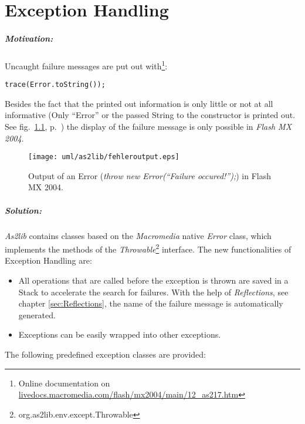 \chapter{Exception Handling}
\label{sec:ExceptionHandling}

\paragraph{Motivation:}
Uncaught failure messages are put out with\footnote{Online documentation on \href{http://livedocs.macromedia.com/flash/mx2004/main/12_as217.htm}{livedocs.macromedia.com/flash/mx2004/main/12\_as217.htm}}:
\begin{lstlisting}[frame=single]
trace(Error.toString());
\end{lstlisting}
Besides the fact that the printed out information is only little or not at all informative (Only ``Error'' or the passed String to the constructor is printed out. See fig.\ \ref{fig:fehleroutput}, p.\ \pageref{fig:fehleroutput}) the display of the failure message is only possible in {\sl Flash MX 2004}.

\begin{figure}[!ht]
\begin{center}
\texttt{[image: uml/as2lib/fehleroutput.eps]}
\caption{Output of an Error (\emph{throw new Error(``Failure occured!'');}) in Flash MX 2004.}
\label{fig:fehleroutput}
\end{center}
\end{figure}

\paragraph{Solution:}
{\sl As2lib} contains classes based on the {\sl Macromedia} native {\sl Error} class, which implements the methods of the \emph{Throwable}\footnote{org.as2lib.env.except.Throwable} interface.
The new functionalities of Exception Handling are:

\begin{itemize}
	\item All operations that are called before the exception is thrown are saved in a Stack to accelerate the search for failures. With the help of \emph{Reflections}, see chapter \ref{sec:Reflections}, the name of the failure message is automatically generated.
	\item Exceptions can be easily wrapped into other exceptions.
\end{itemize}

The following predefined exception classes are provided:

